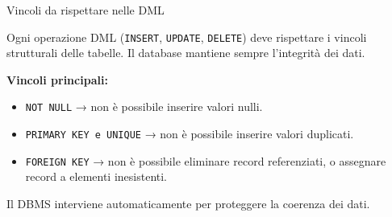\documentclass{beamer}
\begin{document}
\begin{frame}[fragile]{Vincoli da rispettare nelle DML}
\small

Ogni operazione DML (\texttt{INSERT}, \texttt{UPDATE}, \texttt{DELETE}) deve rispettare i vincoli strutturali delle tabelle. Il database mantiene sempre l'integrità dei dati.

\medskip
\textbf{Vincoli principali:}

\begin{itemize}
    \item \texttt{NOT NULL} → non è possibile inserire valori nulli.
    \item \texttt{PRIMARY KEY e UNIQUE} → non è possibile inserire valori duplicati.
    \item \texttt{FOREIGN KEY} → non è possibile eliminare record referenziati, o assegnare record a elementi inesistenti.
\end{itemize}

\medskip
\alert{Il DBMS interviene automaticamente per proteggere la coerenza dei dati.}

\end{frame}

\end{document}
